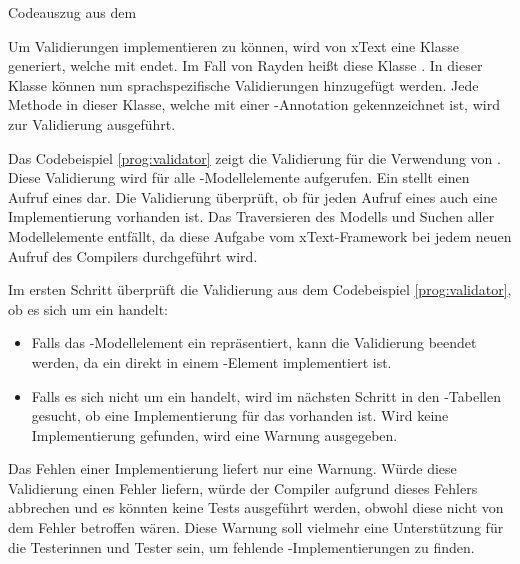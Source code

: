 \begin{program}

\caption{Codeauszug aus dem }
\label{prog:validator}
\end{program}

\SuperPar
Um Validierungen implementieren zu können, wird von xText eine Klasse generiert, welche mit  endet. Im Fall von Rayden heißt diese Klasse . In dieser Klasse können nun sprachspezifische Validierungen hinzugefügt werden. Jede Methode in dieser Klasse, welche mit einer -Annotation gekennzeichnet ist, wird zur Validierung ausgeführt. 

\SuperPar
Das Codebeispiel \ref{prog:validator} zeigt die Validierung für die Verwendung von . Diese Validierung wird für alle -Modellelemente aufgerufen. Ein  stellt einen Aufruf eines  dar. Die Validierung überprüft, ob für jeden Aufruf eines  auch eine Implementierung vorhanden ist. Das Traversieren des Modells und Suchen aller Modellelemente entfällt, da diese Aufgabe vom xText-Framework bei jedem neuen Aufruf des Compilers durchgeführt wird.

\SuperPar
Im ersten Schritt überprüft die Validierung aus dem Codebeispiel \ref{prog:validator}, ob es sich um ein  handelt: \\

\begin{itemize}

\item Falls das -Modellelement ein  repräsentiert, kann die Validierung beendet werden, da ein  direkt in einem -Element implementiert ist. \\

\item Falls es sich nicht um ein  handelt, wird im nächsten Schritt in den -Tabellen gesucht, ob eine Implementierung für das  vorhanden ist. Wird keine Implementierung gefunden, wird eine Warnung ausgegeben. \\

\end{itemize}

\SuperPar
Das Fehlen einer Implementierung liefert nur eine Warnung. Würde diese Validierung einen Fehler liefern, würde der Compiler aufgrund dieses Fehlers abbrechen und es könnten keine Tests ausgeführt werden, obwohl diese nicht von dem Fehler betroffen wären. Diese Warnung soll vielmehr eine Unterstützung für die Testerinnen und Tester sein, um fehlende -Implementierungen zu finden.

